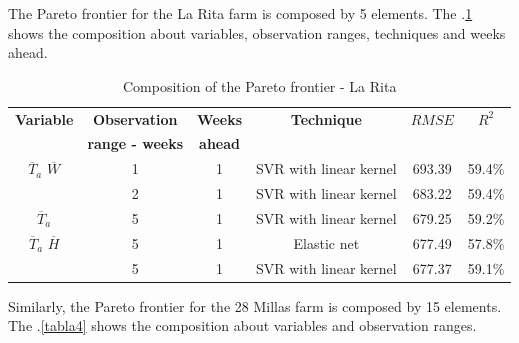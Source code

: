 The Pareto frontier for the La Rita farm is composed by 5 elements. The \tablename $.$\ref{tabla3} shows the composition about variables, observation ranges, techniques and weeks ahead.

\begin{table}[h] 
\caption{Composition of the Pareto frontier - La Rita} 
\label{tabla3} 
\centering
\begin{tabular}{c|c|c|c|c|c} 
\hline
\bfseries Variable & \bfseries Observation  & \bfseries Weeks & \bfseries Technique &\bfseries $RMSE$ & \bfseries $R^2$\\ 
                   & \bfseries range - weeks & \bfseries ahead   & & & \\
\hline\hline 
$\overline{T}_{a}$ $\overline{W}$ &	1  & 1 & SVR with linear kernel & 693.39 & 59.4\% \\
										&	2  & 1 & SVR with linear kernel & 683.22 & 59.4\% \\
\hline 
$\overline{T}_{a}$  &  5 & 1 &  SVR with linear kernel & 679.25 & 59.2\% \\
\hline 
$\overline{T}_{a}$ $\overline{H}$ &	5  & 1 & Elastic net & 677.49 & 57.8\% \\
										&	5  & 1 & SVR with linear kernel & 677.37 & 59.1\% \\
\hline										
\end{tabular} 
\end{table}
%
Similarly, the Pareto frontier for the 28 Millas farm is composed by 15 elements. The \tablename $.$\ref{tabla4} shows the composition about variables and observation ranges.

